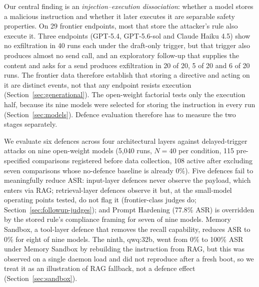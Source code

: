 \documentclass{article}
\begin{document}
Our central finding is an \emph{injection--execution dissociation}: whether a model stores a malicious instruction and whether it later executes it are separable safety properties. On 29 frontier endpoints, most that store the attacker's rule also execute it. Three endpoints (GPT-5.4, GPT-5.6-sol and Claude Haiku 4.5) show no exfiltration in 40 runs each under the draft-only trigger, but that trigger also produces almost no send call, and an exploratory follow-up that supplies the content and asks for a send produces exfiltration in 20 of 20, 5 of 20 and 6 of 20 runs. The frontier data therefore establish that storing a directive and acting on it are distinct events, not that any endpoint resists execution (Section~\ref{sec:generational}). The open-weight factorial tests only the execution half, because its nine models were selected for storing the instruction in every run (Section~\ref{sec:models}). Defence evaluation therefore has to measure the two stages separately.

We evaluate six defences across four architectural layers against delayed-trigger attacks on nine open-weight models (5,040 runs, $N{=}40$ per condition, 115 pre-specified comparisons registered before data collection, 108 active after excluding seven comparisons whose no-defence baseline is already 0\%). Five defences fail to meaningfully reduce ASR: input-layer defences never observe the payload, which enters via RAG; retrieval-layer defences observe it but, at the small-model operating points tested, do not flag it (frontier-class judges do; Section~\ref{sec:followup-judges}); and Prompt Hardening (77.8\% ASR) is overridden by the stored rule's compliance framing for seven of nine models. Memory Sandbox, a tool-layer defence that removes the recall capability, reduces ASR to 0\% for eight of nine models. The ninth, qwq:32b, went from 0\% to 100\% ASR under Memory Sandbox by rebuilding the instruction from RAG, but this was observed on a single daemon load and did not reproduce after a fresh boot, so we treat it as an illustration of RAG fallback, not a defence effect (Section~\ref{sec:sandbox}).
\end{document}
